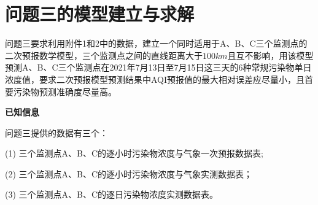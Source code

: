 \documentclass[a4paper,10pt]{my_paper}
\numberwithin{equation}{section}
\begin{document}
\section{问题三的模型建立与求解}
问题三要求利用附件1和2中的数据，建立一个同时适用于A、B、C三个监测点的二次预报数学模型，三个监测点之间的直线距离大于${100km}$且互不影响，用该模型预测A、B、C三个监测点在2021年7月13日至7月15日这三天的6种常规污染物单日浓度值，要求二次预报模型预测结果中AQI预报值的最大相对误差应尽量小，且首要污染物预测准确度尽量高。

\textbf{已知信息}

问题三提供的数据有三个：

(1) 三个监测点A、B、C的逐小时污染物浓度与气象一次预报数据表;

(2) 三个监测点A、B、C的逐小时污染物浓度与气象实测数据表；

(3) 三个监测点A、B、C的逐日污染物浓度实测数据表。




\end{document}
